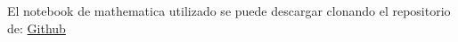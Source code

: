 

\usepackage{fancyhdr}%
\pagestyle{fancy}%
\fancyhead{}
\fancyhead[R]{\footnotesize{\thepage}}
\fancyfoot{}


\begin{titlepage}


El notebook de mathematica utilizado se puede descargar clonando el repositorio de:	\href{https://github.com/DSarceno/Semestre6/tree/main/Electrónica\%20Digital/Tarea\%202}{Github}



\end{titlepage}

